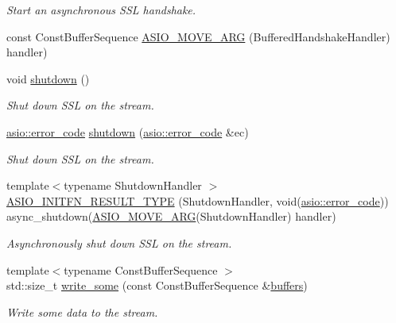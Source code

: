 \begin{DoxyCompactItemize}
\begin{DoxyCompactList}\small\item\em Start an asynchronous S\+S\+L handshake. \end{DoxyCompactList}\item 
const Const\+Buffer\+Sequence \hyperlink{classasio_1_1ssl_1_1stream_a9f2ed1d350e634a0706517ec0fd25fba}{A\+S\+I\+O\+\_\+\+M\+O\+V\+E\+\_\+\+A\+R\+G} (Buffered\+Handshake\+Handler) handler)
\item 
void \hyperlink{classasio_1_1ssl_1_1stream_a5738d2511541cdee020d4b6a24d2df4f}{shutdown} ()
\begin{DoxyCompactList}\small\item\em Shut down S\+S\+L on the stream. \end{DoxyCompactList}\item 
\hyperlink{classasio_1_1error__code}{asio\+::error\+\_\+code} \hyperlink{classasio_1_1ssl_1_1stream_ababf55bdf0211b51b43a4cfe2fe31324}{shutdown} (\hyperlink{classasio_1_1error__code}{asio\+::error\+\_\+code} \&ec)
\begin{DoxyCompactList}\small\item\em Shut down S\+S\+L on the stream. \end{DoxyCompactList}\item 
{\footnotesize template$<$typename Shutdown\+Handler $>$ }\\\hyperlink{classasio_1_1ssl_1_1stream_ab702851f5c9c7ae0fa752bd8be428c58}{A\+S\+I\+O\+\_\+\+I\+N\+I\+T\+F\+N\+\_\+\+R\+E\+S\+U\+L\+T\+\_\+\+T\+Y\+P\+E} (Shutdown\+Handler, void(\hyperlink{classasio_1_1error__code}{asio\+::error\+\_\+code})) async\+\_\+shutdown(\hyperlink{classasio_1_1ssl_1_1stream_ae7bda66895d9126a0e1f1958cc979379}{A\+S\+I\+O\+\_\+\+M\+O\+V\+E\+\_\+\+A\+R\+G}(Shutdown\+Handler) handler)
\begin{DoxyCompactList}\small\item\em Asynchronously shut down S\+S\+L on the stream. \end{DoxyCompactList}\item 
{\footnotesize template$<$typename Const\+Buffer\+Sequence $>$ }\\std\+::size\+\_\+t \hyperlink{classasio_1_1ssl_1_1stream_ab12478afb2ddb7d73b9eb91f523fc5df}{write\+\_\+some} (const Const\+Buffer\+Sequence \&\hyperlink{classasio_1_1ssl_1_1stream_aefa76c1cfe5178bd3e49d3fe06272133}{buffers})
\begin{DoxyCompactList}\small\item\em Write some data to the stream. \end{DoxyCompactList}\item 

\end{DoxyCompactItemize}
